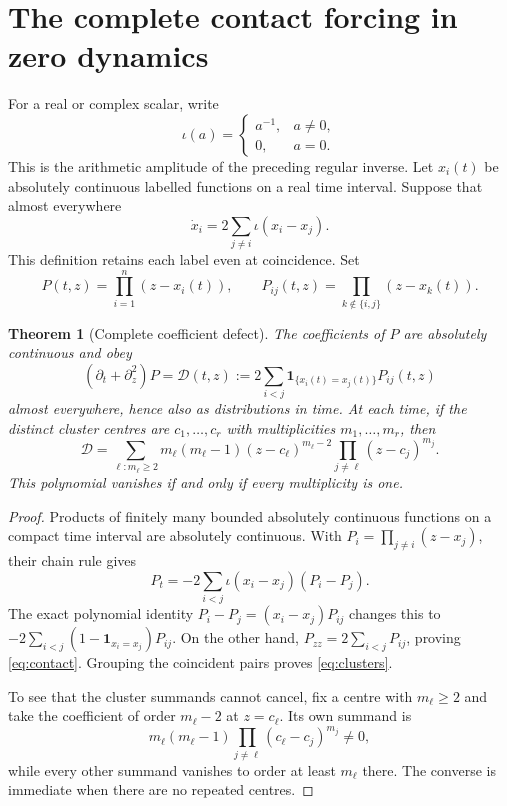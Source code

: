 \documentclass[11pt,a4paper]{article}
\newtheorem{theorem}{Theorem}[section]
\theoremstyle{definition}
\begin{document}
\section{The complete contact forcing in zero dynamics}
For a real or complex scalar, write
\[
 \iota(a)=\begin{cases}a^{-1},&a\ne0,\\0,&a=0.\end{cases}
\]
This is the arithmetic amplitude of the preceding regular inverse. Let $x_i(t)$ be absolutely continuous labelled functions on a real time interval. Suppose that almost everywhere
\begin{equation}\label{eq:totalode}
 \dot x_i=2\sum_{j\ne i}\iota(x_i-x_j).
\end{equation}
This definition retains each label even at coincidence. Set
\[
 P(t,z)=\prod_{i=1}^n(z-x_i(t)),\qquad
 P_{ij}(t,z)=\prod_{k\notin\{i,j\}}(z-x_k(t)).
\]
\begin{theorem}[Complete coefficient defect]\label{thm:contact}
The coefficients of $P$ are absolutely continuous and obey
\begin{equation}\label{eq:contact}
 (\partial_t+\partial_z^2)P
 =\mathcal D(t,z):=
 2\sum_{i<j}\mathbf1_{\{x_i(t)=x_j(t)\}}P_{ij}(t,z)
\end{equation}
almost everywhere, hence also as distributions in time. At each time, if the distinct cluster centres are $c_1,\ldots,c_r$ with multiplicities $m_1,\ldots,m_r$, then
\begin{equation}\label{eq:clusters}
 \mathcal D=
 \sum_{\ell:m_\ell\ge2}
 m_\ell(m_\ell-1)(z-c_\ell)^{m_\ell-2}
 \prod_{j\ne\ell}(z-c_j)^{m_j}.
\end{equation}
This polynomial vanishes if and only if every multiplicity is one.
\end{theorem}
\begin{proof}
Products of finitely many bounded absolutely continuous functions on a compact time interval are absolutely continuous. With $P_i=\prod_{j\ne i}(z-x_j)$, their chain rule gives
\[
 P_t=-2\sum_{i<j}\iota(x_i-x_j)(P_i-P_j).
\]
The exact polynomial identity $P_i-P_j=(x_i-x_j)P_{ij}$ changes this to
$-2\sum_{i<j}(1-\mathbf1_{x_i=x_j})P_{ij}$. On the other hand,
$P_{zz}=2\sum_{i<j}P_{ij}$, proving \eqref{eq:contact}. Grouping the coincident pairs proves \eqref{eq:clusters}.

To see that the cluster summands cannot cancel, fix a centre with $m_\ell\ge2$ and take the coefficient of order $m_\ell-2$ at $z=c_\ell$. Its own summand is
\[
 m_\ell(m_\ell-1)\prod_{j\ne\ell}(c_\ell-c_j)^{m_j}\ne0,
\]
while every other summand vanishes to order at least $m_\ell$ there. The converse is immediate when there are no repeated centres.
\end{proof}
\end{document}
